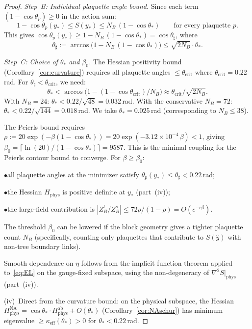 \documentclass[11pt]{article}
\theoremstyle{definition}
\begin{document}
\begin{proof}
\emph{Step~B: Individual plaquette angle bound.}
Since each term $(1-\cos\theta_p)\ge 0$ in the action sum:
\begin{equation}\label{eq:individual-plaq}
1-\cos\theta_p(y_*)\le S(y_*)\le N_B\,(1-\cos\theta_*)
\qquad\text{for every plaquette }p.
\end{equation}
This gives $\cos\theta_p(y_*)\ge 1-N_B\,(1-\cos\theta_*)
=\cos\theta_\sharp$, where
\begin{equation}\label{eq:tsharp}
\theta_\sharp:=\arccos\bigl(1-N_B\,(1-\cos\theta_*)\bigr)
\le\sqrt{2N_B}\cdot\theta_*.
\end{equation}

\emph{Step~C: Choice of $\theta_*$ and $\beta_0$.}
The Hessian positivity bound
(Corollary~\ref{cor:curvature}) requires all plaquette angles
$\le\theta_{\mathrm{crit}}$ where
$\theta_{\mathrm{crit}}=0.22$\,rad.
For $\theta_\sharp<\theta_{\mathrm{crit}}$, we need:
\begin{equation}\label{eq:theta-constraint}
\theta_*<\arccos\bigl(1-(1-\cos\theta_{\mathrm{crit}})/N_B\bigr)
\approx\theta_{\mathrm{crit}}/\sqrt{2N_B}.
\end{equation}
With $N_B=24$: $\theta_*<0.22/\sqrt{48}=0.032$\,rad.
With the conservative $N_B=72$:
$\theta_*<0.22/\sqrt{144}=0.018$\,rad.
We take $\theta_*=0.025$\,rad (corresponding to $N_B\le 38$).

The Peierls bound requires
$\rho:=20\exp(-\beta(1-\cos\theta_*))
=20\exp(-3.12\times 10^{-4}\,\beta)<1$,
giving $\beta_0=\lceil\ln(20)/(1-\cos\theta_*)\rceil=9587$.
This is the minimal coupling for the Peierls contour bound
to converge.  For $\beta\ge\beta_0$:

$\bullet$\quad all plaquette angles at the minimizer satisfy
$\theta_p(y_*)\le\theta_\sharp<0.22$\,rad;

$\bullet$\quad the Hessian $H_{\mathrm{phys}}$ is positive
definite at $y_*$ (part~(iv));

$\bullet$\quad the large-field contribution is
$|Z_B^l/Z_B^s|\le 72\rho/(1-\rho)=O(e^{-c\beta})$.

\noindent
The threshold $\beta_0$ can be lowered if the block geometry
gives a tighter plaquette count $N_B$
(specifically, counting only plaquettes that
contribute to $S(\hat{y})$ with non-tree boundary links).

Smooth dependence on $\eta$ follows from the implicit function theorem
applied to~\eqref{eq:EL} on the gauge-fixed subspace, using the
non-degeneracy of $\nabla^2 S|_{\mathrm{phys}}$ (part~(iv)).

(iv)~Direct from the curvature bound: on the physical subspace,
the Hessian $H^{\mathrm{NA}}_{\mathrm{phys}}
=\cos\theta_*\cdot H^{\mathrm{ab}}_{\mathrm{phys}}+O(\theta_*)$
(Corollary~\ref{cor:NAschur}) has minimum eigenvalue
$\ge\kappa_{\mathrm{eff}}(\theta_*)>0$ for $\theta_*<0.22$\,rad.
\end{proof}
\end{document}
